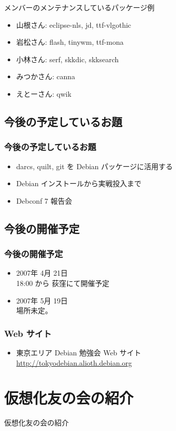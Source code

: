 \documentclass[cjk,dvipdfmx]{beamer}
\begin{document}
\begin{frame}{メンバーのメンテナンスしているパッケージ例}
 \begin{itemize}
 \item 山根さん: eclipse-nls, jd, ttf-vlgothic
 \item 岩松さん: flash, tinywm, ttf-mona
 \item 小林さん: serf, skkdic, skksearch
 \item みつかさん: canna
 \item えとーさん: qwik
 \end{itemize}
\end{frame}

\subsection{今後の予定しているお題}
\begin{frame}
 \frametitle{今後の予定しているお題}
\begin{itemize}
  \item darcs, quilt, git を Debian パッケージに活用する
  \item Debian インストールから実戦投入まで
  \item Debconf 7 報告会
\end{itemize}
\end{frame}

\subsection{今後の開催予定}
\begin{frame}
 \frametitle{今後の開催予定}
\begin{itemize}
  \item 2007年 4月 21日\\
	18:00 から 荻窪にて開催予定
  \item 2007年 5月 19日\\
	場所未定。
\end{itemize}
\end{frame}

\begin{frame}
 \frametitle{Web サイト}
\begin{itemize}
  \item 東京エリア Debian 勉強会 Web サイト\\
	\url{http://tokyodebian.alioth.debian.org}
\end{itemize}
\end{frame}

\section{仮想化友の会の紹介}
\begin{frame}{}

{仮想化友の会の紹介}
 
\end{frame}
\end{document}
